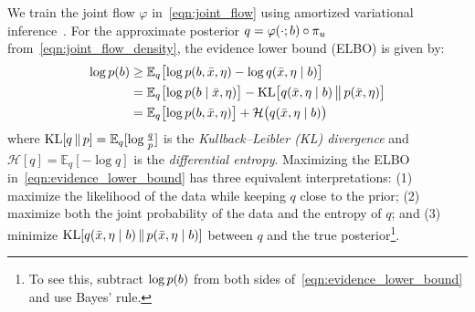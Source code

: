 We train the joint flow $\varphi$ in~\eqref{eqn:joint_flow} using amortized variational inference~\citep{kingma_auto-encoding_2014,rezende_stochastic_2014,rezende_variational_2016,papamakarios_normalizing_2021}.
For the approximate posterior $q = \varphi(\cdot; b) \circ \pi_{u}$ from~\eqref{eqn:joint_flow_density}, the evidence lower bound (\gls*{ELBO}) is given by:
\begin{align}\label{eqn:evidence_lower_bound}
    \begin{split}
        \log p(b) & \ge \mathbb{E}_{q} \bigl[ \log p(b, \bar{x}, \eta) - \log q(\bar{x}, \eta \mid b) \bigr]                                             \\
        & = \mathbb{E}_{q} \bigl[ \log p(b \mid \bar{x}, \eta) \bigr] - \operatorname{KL} \bigl[ q(\bar{x}, \eta \mid b) \,\big\|\, p(\bar{x}, \eta) \bigr] \\
        & = \mathbb{E}_{q} \bigl[ \log p(b, \bar{x}, \eta) \bigr] + \mathcal{H} \bigl( q(\bar{x}, \eta \mid b) \bigr)
    \end{split}
\end{align}
where $\operatorname{KL}[q \,\|\, p] = \mathbb{E}_{q} [ \log \frac{q}{p} ]$ is the \textit{Kullback--Leibler (\gls*{KL}) divergence} and $\mathcal{H}[q] = \mathbb{E}_{q}[-\log q]$ is the \textit{differential entropy}.
Maximizing the \gls*{ELBO} in~\eqref{eqn:evidence_lower_bound} has three equivalent interpretations:
(1) maximize the likelihood of the data while keeping $q$ close to the prior;
(2) maximize both the joint probability of the data and the entropy of $q$; and
(3) minimize $\operatorname{KL} [ q(\bar{x}, \eta \mid b) \,\|\, p(\bar{x}, \eta \mid b)  ]$ between $q$ and the true posterior\footnote{To see this, subtract $\log p(b)$ from both sides of~\eqref{eqn:evidence_lower_bound} and use Bayes' rule.}.

